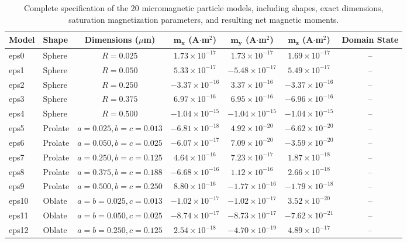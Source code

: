 \documentclass[11pt,a4paper]{article}
\begin{document}
\begin{landscape}
\begin{table}[!htbp]
\centering
\caption{Complete specification of the 20 micromagnetic particle models, including shapes, exact dimensions, saturation magnetization parameters, and resulting net magnetic moments.}
\label{tab:models_si}
\begin{tabular}{llccccc}
\hline
\textbf{Model} & \textbf{Shape} & \textbf{Dimensions ($\mu$m)} & $\mathbf{m_x}$ (A$\cdot$m$^2$) & $\mathbf{m_y}$ (A$\cdot$m$^2$) & $\mathbf{m_z}$ (A$\cdot$m$^2$) & \textbf{Domain State} \\ \hline
eps0 & Sphere & $R = 0.025$ & $1.73 \times 10^{-17}$ & $1.73 \times 10^{-17}$ & $1.69 \times 10^{-17}$ & -- \\
eps1 & Sphere & $R = 0.050$ & $5.33 \times 10^{-17}$ & $-5.48 \times 10^{-17}$ & $5.49 \times 10^{-17}$ & -- \\
eps2 & Sphere & $R = 0.250$ & $-3.37 \times 10^{-16}$ & $3.37 \times 10^{-16}$ & $-3.37 \times 10^{-16}$ & -- \\
eps3 & Sphere & $R = 0.375$ & $6.97 \times 10^{-16}$ & $6.95 \times 10^{-16}$ & $-6.96 \times 10^{-16}$ & -- \\
eps4 & Sphere & $R = 0.500$ & $-1.04 \times 10^{-15}$ & $-1.04 \times 10^{-15}$ & $-1.04 \times 10^{-15}$ & -- \\ \hline
eps5 & Prolate & $a = 0.025, b = c = 0.013$ & $-6.81 \times 10^{-18}$ & $4.92 \times 10^{-20}$ & $-6.62 \times 10^{-20}$ & -- \\
eps6 & Prolate & $a = 0.050, b = c = 0.025$ & $-6.07 \times 10^{-17}$ & $7.09 \times 10^{-20}$ & $-3.59 \times 10^{-20}$ & -- \\
eps7 & Prolate & $a = 0.250, b = c = 0.125$ & $4.64 \times 10^{-16}$ & $7.23 \times 10^{-17}$ & $1.87 \times 10^{-18}$ & -- \\
eps8 & Prolate & $a = 0.375, b = c = 0.188$ & $-6.68 \times 10^{-16}$ & $1.12 \times 10^{-16}$ & $2.66 \times 10^{-18}$ & -- \\
eps9 & Prolate & $a = 0.500, b = c = 0.250$ & $8.80 \times 10^{-16}$ & $-1.77 \times 10^{-16}$ & $-1.79 \times 10^{-18}$ & -- \\ \hline
eps10 & Oblate & $a = b = 0.025, c = 0.013$ & $-1.02 \times 10^{-17}$ & $-1.02 \times 10^{-17}$ & $3.52 \times 10^{-20}$ & -- \\
eps11 & Oblate & $a = b = 0.050, c = 0.025$ & $-8.74 \times 10^{-17}$ & $-8.73 \times 10^{-17}$ & $-7.62 \times 10^{-21}$ & -- \\
eps12 & Oblate & $a = b = 0.250, c = 0.125$ & $2.54 \times 10^{-18}$ & $-4.70 \times 10^{-19}$ & $4.89 \times 10^{-17}$ & -- \\

\end{tabular}
\end{table}
\end{landscape}
\end{document}
